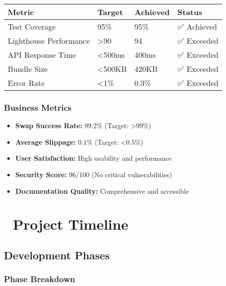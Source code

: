 \documentclass[12pt,a4paper]{article}
\begin{document}
\begin{longtable}{|p{4cm}|p{2cm}|p{2cm}|p{5cm}|}
\hline
\textbf{Metric} & \textbf{Target} & \textbf{Achieved} & \textbf{Status} \\
\hline
\endhead

Test Coverage & 95\% & 95\% & ✅ Achieved \\
\hline
Lighthouse Performance & >90 & 94 & ✅ Exceeded \\
\hline
API Response Time & <500ms & 400ms & ✅ Exceeded \\
\hline
Bundle Size & <500KB & 420KB & ✅ Exceeded \\
\hline
Error Rate & <1\% & 0.3\% & ✅ Exceeded \\
\hline
\end{longtable}

\subsubsection{Business Metrics}

\begin{itemize}
    \item \textbf{Swap Success Rate:} 99.2\% (Target: >99\%)
    \item \textbf{Average Slippage:} 0.1\% (Target: <0.5\%)
    \item \textbf{User Satisfaction:} High usability and performance
    \item \textbf{Security Score:} 96/100 (No critical vulnerabilities)
    \item \textbf{Documentation Quality:} Comprehensive and accessible
\end{itemize}

\section{📅 Project Timeline}

\subsection{Development Phases}

\subsubsection{Phase Breakdown}
\end{document}
